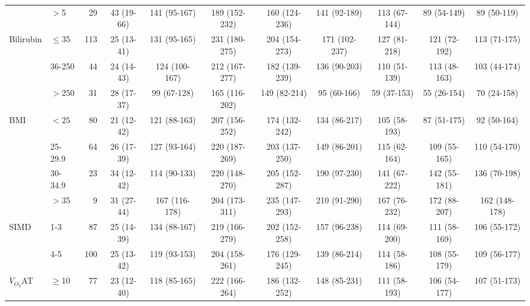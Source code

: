 \begin{sidewaystable}[p]
\begin{tabular}{|llr | cccccccc|}
		                    & $>$5      & 29  & 43 (19-66) & 141 (95-167)  & 189 (152-232) & 160 (124-236) & 141 (92-189)  & 113 (67-144)  & 89 (54-149)  & 89 (50-119)   \\
		Bilirubin           & $\leq$35  & 113 & 25 (13-41) & 131 (95-165)  & 231 (180-275) & 204 (154-273) & 171 (102-237) & 127 (81-218)  & 121 (72-192) & 113 (71-175)  \\
		                    & 36-250    & 44  & 24 (14-43) & 124 (100-167) & 212 (167-277) & 182 (139-239) & 136 (90-203)  & 110 (51-139)  & 113 (48-163) & 103 (44-174)  \\
		                    & $>$250    & 31  & 28 (17-37) & 99 (67-128)   & 165 (116-202) & 149 (82-214)  & 95 (60-166)   & 59 (37-153)   & 55 (26-154)  & 70 (24-158)   \\
		BMI                 & $<25$     & 80  & 21 (12-42) & 121 (88-163)  & 207 (156-252) & 174 (132-242) & 134 (86-217)  & 105 (58-193)  & 87 (51-175)  & 92 (50-164)   \\
		                    & 25-29.9   & 64  & 26 (17-39) & 127 (93-164)  & 220 (187-269) & 203 (137-250) & 149 (86-201)  & 115 (62-164)  & 109 (55-165) & 110 (54-170)  \\
		                    & 30-34.9   & 23  & 34 (12-42) & 114 (90-133)  & 220 (148-270) & 205 (152-287) & 190 (97-230)  & 141 (67-222)  & 142 (55-181) & 136 (70-198)  \\
		                    & $>$35     & 9   & 31 (27-44) & 167 (116-178) & 204 (173-311) & 235 (147-293) & 210 (91-290)  & 167 (76-232)  & 172 (88-207) & 162 (148-178) \\
		SIMD                & 1-3       & 87  & 25 (14-39) & 134 (88-167)  & 219 (166-279) & 202 (152-258) & 157 (96-238)  & 114 (69-200)  & 111 (58-169) & 106 (55-172)  \\
		                    & 4-5       & 100 & 25 (13-42) & 119 (93-153)  & 204 (158-261) & 176 (129-245) & 139 (86-214)  & 114 (58-186)  & 108 (55-179) & 109 (56-177)  \\
		$\dot{V}_{O_2}$AT   & $\geq$10  & 77  & 23 (12-40) & 118 (85-165)  & 222 (166-264) & 186 (132-252) & 148 (85-231)  & 111 (58-193)  & 106 (54-177) & 107 (51-173)  \\

\end{tabular}
\end{sidewaystable}
